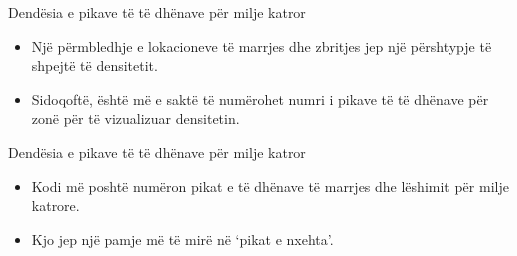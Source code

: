 \documentclass[
  ignorenonframetext,
]{beamer}
\begin{document}
\begin{frame}{Dendësia e pikave të të dhënave për milje katror}
\protect\hypertarget{denduxebsia-e-pikave-tuxeb-tuxeb-dhuxebnave-puxebr-milje-katror}{}
\begin{itemize}
\item
  Një përmbledhje e lokacioneve të marrjes dhe zbritjes jep një
  përshtypje të shpejtë të densitetit.
\item
  Sidoqoftë, është më e saktë të numërohet numri i pikave të të dhënave
  për zonë për të vizualizuar densitetin.
\end{itemize}
\end{frame}

\begin{frame}{Dendësia e pikave të të dhënave për milje katror}
\protect\hypertarget{denduxebsia-e-pikave-tuxeb-tuxeb-dhuxebnave-puxebr-milje-katror-1}{}
\begin{itemize}
\item
  Kodi më poshtë numëron pikat e të dhënave të marrjes dhe lëshimit për
  milje katrore.
\item
  Kjo jep një pamje më të mirë në `pikat e nxehta'.
\end{itemize}
\end{frame}
\end{document}
